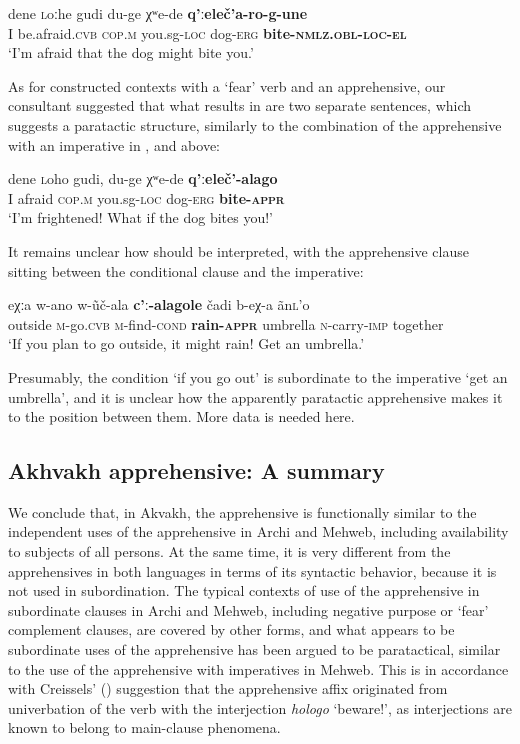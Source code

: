 \documentclass[output=paper,colorlinks,citecolor=brown]{langscibook}
\begin{document}
\ea \label{ex:DD75}
\gll dene \textsc{l}oːhe gudi du-ge χʷe-de \textbf{q'ːeleč'a-ro-g-une} \\
I be.afraid.\textsc{cvb} \textsc{cop.m} you.sg\textsc{-loc} dog-\textsc{erg} \textbf{bite-\textsc{nmlz.obl-loc-el}} \\
\glt `I'm afraid that the dog might bite you.'
\z


As for constructed contexts with a `fear' verb and an apprehensive, our consultant suggested that what results in  are two separate sentences, which suggests a paratactic structure, similarly to the combination of the apprehensive with an imperative in ,  and  above:


\ea \label{ex:DD76}
\gll dene \textsc{l}oho gudi, du-ge χʷe-de \textbf{q'ːeleč'-alago} \\
I afraid \textsc{cop.m} you.sg\textsc{-loc} dog-\textsc{erg} \textbf{bite-\textsc{appr}} \\
\glt `I'm frightened! What if the dog bites you!'
\z



 It remains unclear how  should be interpreted, with the apprehensive clause sitting between the conditional clause and the imperative:


\ea \label{ex:DD77}
\gll eχːa w-ano w-\~uč-ala \textbf{c'ː-alagole} čadi b-eχ-a \~an\textsc{l}'o \\
outside \textsc{m}-go.\textsc{cvb} \textsc{m}-find-\textsc{cond} \textbf{rain-\textsc{appr}} umbrella \textsc{n}-carry-\textsc{imp} together \\
\glt `If you plan to go outside, it might rain! Get an umbrella.'
\z



\noindent Presumably, the condition `if you go out' is subordinate to the imperative `get an umbrella', and it is unclear how the apparently paratactic apprehensive makes it to the position between them. More data is needed here.
 

\subsection{Akhvakh apprehensive: A summary}
\label{subsec:NAapprehensive}
 
We conclude that, in Akvakh, the apprehensive is functionally similar to the independent uses of the apprehensive in Archi and Mehweb, including availability to subjects of all persons. At the same time, it is very different from the apprehensives in both languages in terms of its syntactic behavior, because it is not used in subordination. The typical contexts of use of the apprehensive in subordinate clauses in Archi and Mehweb, including negative purpose or `fear' complement clauses, are covered by other forms, and what appears to be subordinate uses of the apprehensive has been argued to be paratactical, similar to the use of the apprehensive with imperatives in Mehweb. This is in accordance with Creissels' (\citeyear{Creisselsunpublished2}) suggestion that the apprehensive affix originated from univerbation of the verb with the interjection \textit{hologo} `beware!', as interjections are known to belong to main-clause phenomena. 
\end{document}
